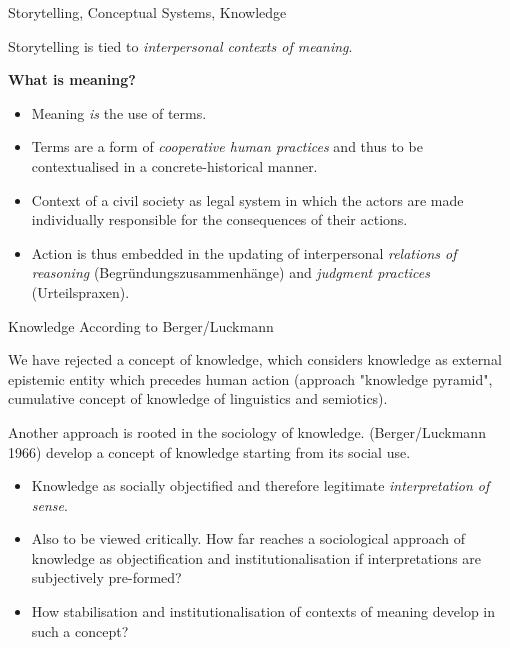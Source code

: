 \documentclass{beamer}
\begin{document}
\begin{frame}{Storytelling, Conceptual Systems, Knowledge}

Storytelling is tied to \emph{interpersonal contexts of meaning}.

\textbf{What is meaning?}
\begin{itemize}
\item Meaning \emph{is} the use of terms.
\item Terms are a form of \emph{cooperative human practices} and thus to be
  contextualised in a concrete-historical manner.
\item Context of a civil society as legal system in which the actors are made
  individually responsible for the consequences of their actions.
\item Action is thus embedded in the updating of interpersonal \emph{relations
  of reasoning} (Begründungszusammenhänge) and \emph{judgment practices}
  (Urteilspraxen).
\end{itemize}
\end{frame}
\begin{frame}{Knowledge According to Berger/Luckmann}

We have rejected a concept of knowledge, which considers knowledge as external
epistemic entity which precedes human action (approach "knowledge pyramid",
cumulative concept of knowledge of linguistics and semiotics).

Another approach is rooted in the sociology of knowledge.  (Berger/Luckmann
1966) develop a concept of knowledge starting from its social use.
\begin{itemize}
\item Knowledge as socially objectified and therefore legitimate
  \emph{interpretation of sense}.
\item Also to be viewed critically. How far reaches a sociological approach of
  knowledge as objectification and institutionalisation if interpretations are
  subjectively pre-formed?
\item How stabilisation and institutionalisation of contexts of meaning
  develop in such a concept?
\end{itemize}\bigskip
\end{frame}
\end{document}
